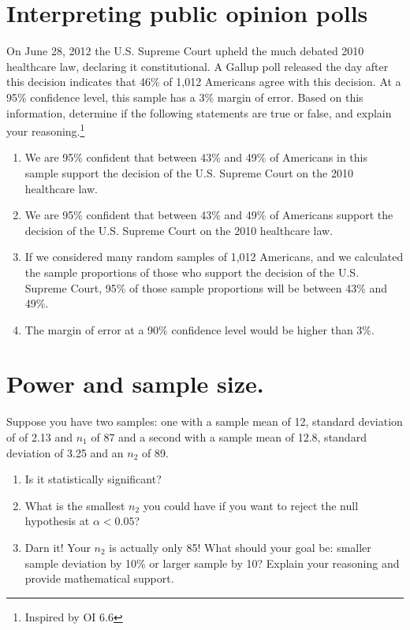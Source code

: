 \documentclass[
]{article}
\providecommand{\tightlist}{%
  \setlength{\itemsep}{0pt}\setlength{\parskip}{0pt}}
\begin{document}
\section{Interpreting public opinion
polls}\label{interpreting-public-opinion-polls}

On June 28, 2012 the U.S. Supreme Court upheld the much debated 2010
healthcare law, declaring it constitutional. A Gallup poll released the
day after this decision indicates that 46\% of 1,012 Americans agree
with this decision. At a 95\% confidence level, this sample has a 3\%
margin of error. Based on this information, determine if the following
statements are true or false, and explain your reasoning.\footnote{Inspired
  by OI 6.6}

\begin{enumerate}
\def\labelenumi{\alph{enumi}.}
\item
  We are 95\% confident that between 43\% and 49\% of Americans in this
  sample support the decision of the U.S. Supreme Court on the 2010
  healthcare law.
\item
  We are 95\% confident that between 43\% and 49\% of Americans support
  the decision of the U.S. Supreme Court on the 2010 healthcare law.
\item
  If we considered many random samples of 1,012 Americans, and we
  calculated the sample proportions of those who support the decision of
  the U.S. Supreme Court, 95\% of those sample proportions will be
  between 43\% and 49\%.
\item
  The margin of error at a 90\% confidence level would be higher than
  3\%.
\end{enumerate}

\section{Power and sample size.}\label{power-and-sample-size.}

Suppose you have two samples: one with a sample mean of 12, standard
deviation of of 2.13 and \(n_1\) of 87 and a second with a sample mean
of 12.8, standard deviation of 3.25 and an \(n_2\) of 89.

\begin{enumerate}
\def\labelenumi{\alph{enumi}.}
\tightlist
\item
  Is it statistically significant?
\item
  What is the smallest \(n_2\) you could have if you want to reject the
  null hypothesis at \(\alpha < 0.05\)?
\item
  Darn it! Your \(n_2\) is actually only 85! What should your goal be:
  smaller sample deviation by 10\% or larger sample by 10? Explain your
  reasoning and provide mathematical support.
\end{enumerate}
\end{document}
